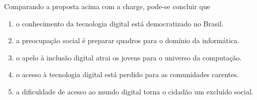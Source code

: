 \documentclass{exam}
\begin{document}
\begin{questions}
Comparando a proposta acima com a charge, pode-se concluir que
	\begin{enumerate}[label=\alph*)]
		\item  o conhecimento da tecnologia digital está democratizado no Brasil. 
		\item  a preocupação social é preparar quadros para o domínio da informática. 
		\item  o apelo à inclusão digital atrai os jovens para o universo da computação. 
		\item  o acesso à tecnologia digital está perdido para as comunidades carentes. 
		\item  a dificuldade de acesso ao mundo digital torna o cidadão um excluído social.
	\end{enumerate}

\end{questions}
\end{document}
